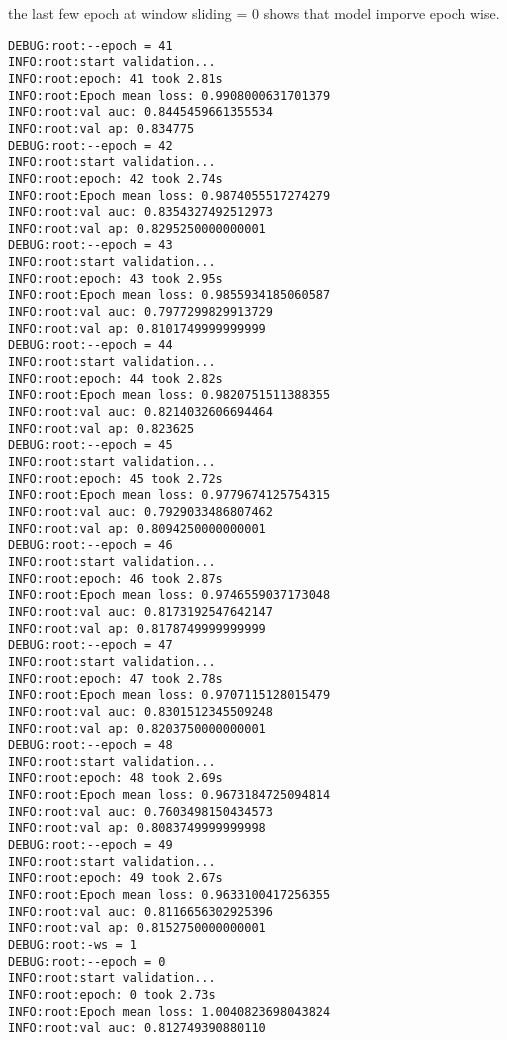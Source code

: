 \documentclass[11pt]{article}
\begin{document}
the last few epoch at window sliding = 0 shows that model imporve epoch wise.
\begin{verbatim}
DEBUG:root:--epoch = 41
INFO:root:start validation...
INFO:root:epoch: 41 took 2.81s
INFO:root:Epoch mean loss: 0.9908000631701379
INFO:root:val auc: 0.8445459661355534
INFO:root:val ap: 0.834775
DEBUG:root:--epoch = 42
INFO:root:start validation...
INFO:root:epoch: 42 took 2.74s
INFO:root:Epoch mean loss: 0.9874055517274279
INFO:root:val auc: 0.8354327492512973
INFO:root:val ap: 0.8295250000000001
DEBUG:root:--epoch = 43
INFO:root:start validation...
INFO:root:epoch: 43 took 2.95s
INFO:root:Epoch mean loss: 0.9855934185060587
INFO:root:val auc: 0.7977299829913729
INFO:root:val ap: 0.8101749999999999
DEBUG:root:--epoch = 44
INFO:root:start validation...
INFO:root:epoch: 44 took 2.82s
INFO:root:Epoch mean loss: 0.9820751511388355
INFO:root:val auc: 0.8214032606694464
INFO:root:val ap: 0.823625
DEBUG:root:--epoch = 45
INFO:root:start validation...
INFO:root:epoch: 45 took 2.72s
INFO:root:Epoch mean loss: 0.9779674125754315
INFO:root:val auc: 0.7929033486807462
INFO:root:val ap: 0.8094250000000001
DEBUG:root:--epoch = 46
INFO:root:start validation...
INFO:root:epoch: 46 took 2.87s
INFO:root:Epoch mean loss: 0.9746559037173048
INFO:root:val auc: 0.8173192547642147
INFO:root:val ap: 0.8178749999999999
DEBUG:root:--epoch = 47
INFO:root:start validation...
INFO:root:epoch: 47 took 2.78s
INFO:root:Epoch mean loss: 0.9707115128015479
INFO:root:val auc: 0.8301512345509248
INFO:root:val ap: 0.8203750000000001
DEBUG:root:--epoch = 48
INFO:root:start validation...
INFO:root:epoch: 48 took 2.69s
INFO:root:Epoch mean loss: 0.9673184725094814
INFO:root:val auc: 0.7603498150434573
INFO:root:val ap: 0.8083749999999998
DEBUG:root:--epoch = 49
INFO:root:start validation...
INFO:root:epoch: 49 took 2.67s
INFO:root:Epoch mean loss: 0.9633100417256355
INFO:root:val auc: 0.8116656302925396
INFO:root:val ap: 0.8152750000000001
DEBUG:root:-ws = 1
DEBUG:root:--epoch = 0
INFO:root:start validation...
INFO:root:epoch: 0 took 2.73s
INFO:root:Epoch mean loss: 1.0040823698043824
INFO:root:val auc: 0.812749390880110
\end{verbatim}
\end{document}
